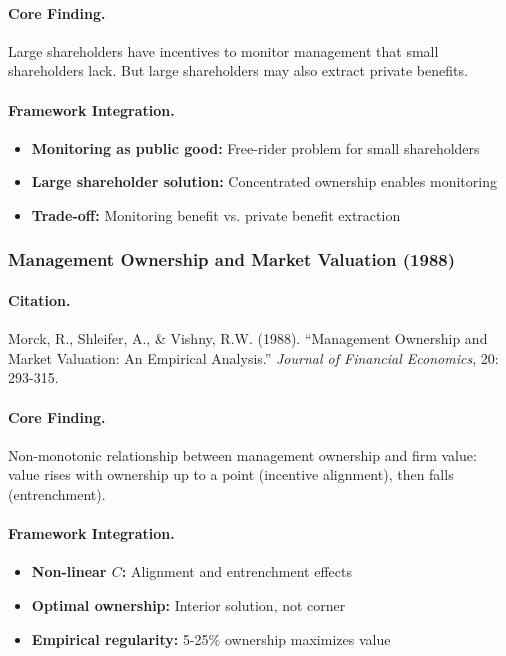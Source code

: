 \documentclass[12pt,a4paper]{article}
\begin{document}
\paragraph{Core Finding.}
Large shareholders have incentives to monitor management that small
shareholders lack. But large shareholders may also extract private benefits.

\paragraph{Framework Integration.}
\begin{itemize}
  \item \textbf{Monitoring as public good:} Free-rider problem for small shareholders
  \item \textbf{Large shareholder solution:} Concentrated ownership enables monitoring
  \item \textbf{Trade-off:} Monitoring benefit vs. private benefit extraction
\end{itemize}

\subsubsection{Management Ownership and Market Valuation (1988)}

\paragraph{Citation.}
Morck, R., Shleifer, A., \& Vishny, R.W. (1988).
``Management Ownership and Market Valuation: An Empirical Analysis.''
\emph{Journal of Financial Economics}, 20: 293-315.

\paragraph{Core Finding.}
Non-monotonic relationship between management ownership and firm value:
value rises with ownership up to a point (incentive alignment), then
falls (entrenchment).

\paragraph{Framework Integration.}
\begin{itemize}
  \item \textbf{Non-linear $C$:} Alignment and entrenchment effects
  \item \textbf{Optimal ownership:} Interior solution, not corner
  \item \textbf{Empirical regularity:} 5-25\% ownership maximizes value
\end{itemize}
\end{document}
